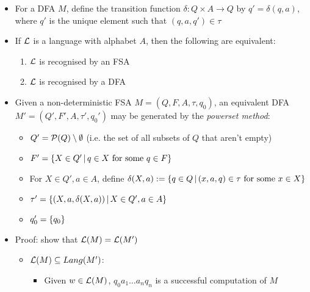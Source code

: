 \begin{itemize}
	
	\item For a DFA $ M $, define the transition function $ \delta: Q \times A \to Q $ by $ q' = \delta(q, a) $, where $ q' $ is the unique element such that $ (q, a, q') \in \tau $
	
	\item If $ \mathcal{L} $ is a language with alphabet $ A $, then the following are equivalent:
	
	\begin{enumerate}
		\item $ \mathcal{L} $ is recognised by an FSA
		
		\item $ \mathcal{L} $ is recognised by a DFA
	\end{enumerate}
	
	\item Given a non-deterministic FSA $ M = (Q, F, A, \tau, q_0) $, an equivalent DFA $ M' = (Q', F', A, \tau', q_0') $ may be generated by the \textit{powerset method}:
	
	\begin{itemize}
		
		\item $ Q' = \mathcal{P}(Q) \setminus \emptyset $ (i.e. the set of all subsets of $ Q $ that aren't empty)
		
		\item $ F' = \left\lbrace X \in Q' \, | \, q \in X \text{ for some } q \in F \right\rbrace $
		
		\item For $ X \in Q', a \in A $, define $ \delta(X, a) := \left\lbrace q \in Q \, | \, (x, a, q) \in \tau \text{ for some } x \in X \right\rbrace $
		
		\item $ \tau' = \left\lbrace (X, a, \delta(X, a)) \, | \, X \in Q', a \in A \right\rbrace $
		
		\item $ q_0' = \left\lbrace q_0 \right\rbrace $
		
	\end{itemize}

	\item Proof: show that $ \mathcal{L}(M) = \mathcal{L}(M') $
	
	\begin{itemize}
		\item $ \mathcal{L}(M) \subseteq Lang(M') $:
		
		\begin{itemize}
			\item Given $ w \in \mathcal{L}(M) $, $  q_0 a_1 \dots a_n q_n $ is a successful computation of $ M $
			

\end{itemize}
\end{itemize}
\end{itemize}

